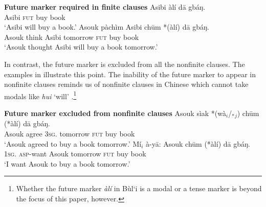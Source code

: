 \documentclass[output=paper,colorlinks,citecolor=brown]{langscibook}
\begin{document}
\ea%
    \label{ex:sulemana:8}
    {\bf{Future marker required in finite clauses}}
    \ea%
    \label{ex:sulemana:8a}
    \gll    Asibi àlí dā gbáŋ.\\
            Asibi \textsc{fut} buy book\\
    \glt    `Asibi will buy a book.'
    \ex%
    \label{ex:sulemana:8b}
    \gll    Asouk pàchìm Asibi chūm *(àlí) dā gbáŋ.\\
            Asouk think Asibi tomorrow \textsc{fut}  buy book\\
    \glt    `Asouk thought Asibi will buy a book tomorrow.' 
    \z
\z

In contrast, the future marker is excluded from all the nonfinite clauses. The examples in  illustrate this point. The inability of the future marker to appear in nonfinite clauses reminds us of nonfinite clauses in Chinese which cannot take modals like {\it{hui}} `will' \citep{Huang1998}.\footnote{Whether the future marker {\it{àlí}} in Bùl`i is a modal or a tense marker is beyond the focus of this paper, however.} 

\ea%
    \label{ex:sulemana:9}
    {\bf{Future marker excluded from nonfinite clauses}}
    \ea%
    \label{ex:sulemana:9a}
    \gll    Asouk sìak *(wà$_i$/$_*${}$_j$) chūm (*àlí) dā gbáŋ.\\
            Asouk agree \textsc{3sg}. tomorrow \textsc{fut} buy book\\
    \glt    `Asouk agreed to buy a book tomorrow.'
    \ex%
    \label{ex:sulemana:9b}
    \gll    Mí$_i$ à-yā: Asouk chūm (*àlí) dā gbáŋ.\\
            \textsc{1sg}. \textsc{asp}-want Asouk  tomorrow \textsc{fut}  buy book\\
    \glt    `I want Asouk to buy a book tomorrow.' 
    \z
\z
\end{document}

